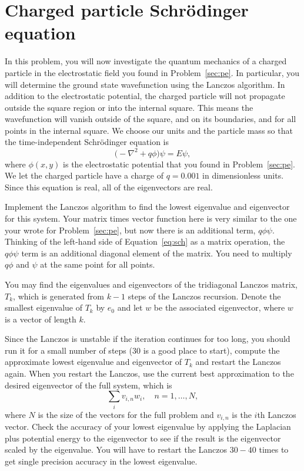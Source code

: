 \section{Charged particle Schrödinger equation}

In this problem, you will now investigate the quantum mechanics of a charged particle in the
electrostatic field you found in Problem~\ref{sec:pe}. In particular, you will determine the
ground state wavefunction using the Lanczos algorithm. In addition to the electrostatic
potential, the charged particle will not propagate outside the square region or into the
internal square. This means the wavefunction will vanish outside of the square, and on its
boundaries, and for all points in the internal square. We choose our units and the particle
mass so that the time-independent Schrödinger equation is
%
\begin{equation}\label{eq:sch}
    \bigl( -\nabla^2 + q \phi \bigr) \psi = E \psi,
\end{equation}
%
where \(\phi(x, y)\) is the electrostatic potential that you found in Problem~\ref{sec:pe}.
We let the charged particle have a charge of \(q = 0.001\) in dimensionless units. Since
this equation is real, all of the eigenvectors are real.

Implement the Lanczos algorithm to find the lowest eigenvalue and eigenvector for this
system. Your matrix times vector function here is very similar to the one your wrote for
Problem~\ref{sec:pe}, but now there is an additional term, \(q \phi \psi\).
Thinking of the left-hand side of Equation~\eqref{eq:sch}
as a matrix operation, the \(q \phi \psi\) term is an additional diagonal element of the
matrix. You need to multiply \(q \phi\) and \(\psi\) at the same point for all points.

You may find the eigenvalues and eigenvectors of the tridiagonal Lanczos matrix, \(T_k\),
which is generated from \(k - 1\) steps of the Lanczos recursion. Denote the smallest
eigenvalue of \(T_k\) by \(e_0\) and let \(w\) be the associated eigenvector, where \(w\) is
a vector of length \(k\).

Since the Lanczos is unstable if the iteration continues for too long, you should run it for
a small number of steps (\(30\) is a good place to start), compute the approximate lowest
eigenvalue and eigenvector of \(T_k\) and restart the Lanczos again. When you restart the
Lanczos, use the current best approximation to the desired eigenvector of the full system,
which is
%
\begin{equation}
    \sum_i v_{i, n} w_i, \quad n = 1, \ldots, N,
\end{equation}
%
where \(N\) is the size of the vectors for the full problem and \(v_{i, n}\) is the \(i\)th
Lanczos vector. Check the accuracy of your lowest eigenvalue by applying the Laplacian plus
potential energy to the eigenvector to see if the result is the eigenvector scaled by the
eigenvalue. You will have to restart the Lanczos \(30 - 40\) times to get single precision
accuracy in the lowest eigenvalue.

